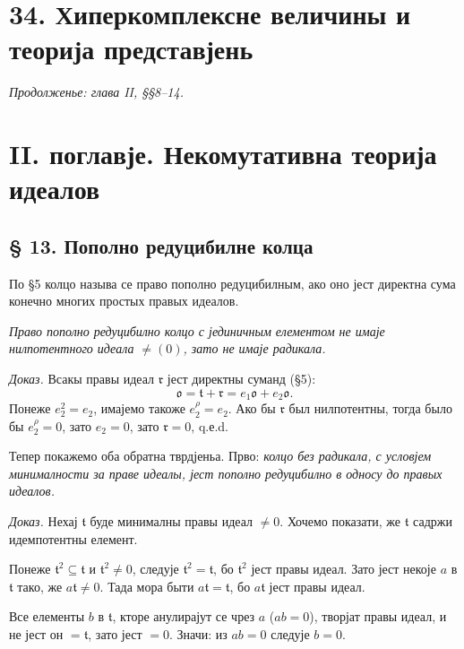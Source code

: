 ﻿\documentclass[11pt]{article}
\providecommand{\mo}{\mathfrak{o}}
\providecommand{\mr}{\mathfrak{r}}
\providecommand{\mt}{\mathfrak{t}}
\begin{document}
\section*{34. Хиперкомплексне величины и теорија представјень}
\emph{Продолженье: глава II, §§8--14.}

\section*{II. поглавје. Некомутативна теорија идеалов}

\subsection*{§ 13. Пополно редуцибилне колца}

По §5 колцо называ се право пополно редуцибилным, ако оно јест директна сума конечно многих простых правых идеалов.

\emph{Право пополно редуцибилно колцо с јединичным елементом не имаје нилпотентного идеала $\ne(0)$, зато не имаје радикала.}

\emph{Доказ.} Всакы правы идеал $\mr$ јест директны суманд (§5):
\[
        \mo=\mt+\mr=e_1\mo+e_2\mo.
\]
Понеже $e_2^2=e_2$, имајемо такоже $e_2^\rho=e_2$. Ако бы $\mr$ был нилпотентны, тогда было бы $e_2^\rho=0$, зато $e_2=0$, зато $\mr=0$, q.е.d.

Тепер покажемо оба обратна тврдјеньа. Прво: \emph{колцо без радикала, с условјем минималности за праве идеалы, јест пополно редуцибилно в односу до правых идеалов.}

\emph{Доказ.} Нехај $\mt$ буде минималны правы идеал $\ne0$. Хочемо показати, же $\mt$ садржи идемпотентны елемент.

Понеже $\mt^2\subseteq\mt$ и $\mt^2\ne0$, следује $\mt^2=\mt$, бо $\mt^2$ јест правы идеал. Зато јест некоје $a$ в $\mt$ тако, же $a\mt\ne0$. Тада мора быти $a\mt=\mt$, бо $a\mt$ јест правы идеал.

Все елементы $b$ в $\mt$, кторе анулирајут се чрез $a$ ($ab=0$), творјат правы идеал, и не јест он $=\mt$, зато јест $=0$. Значи: из $ab=0$ следује $b=0$.
\end{document}
